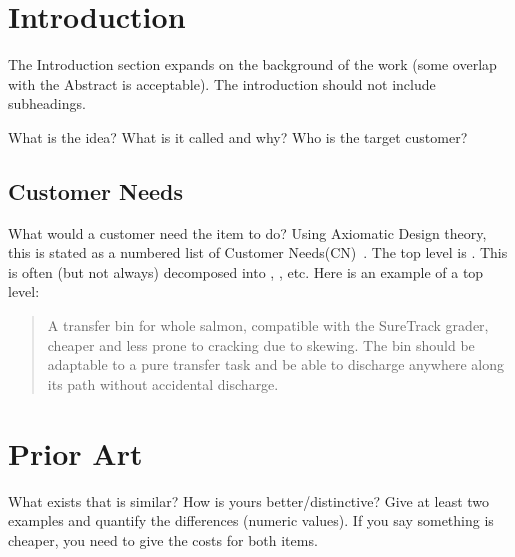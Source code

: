 \documentclass[sn-mathphys,pdflatex]{sn-jnl}%
\theoremstyle{thmstyleone}%
\theoremstyle{thmstyletwo}%
\theoremstyle{thmstylethree}%
\begin{document}
\section{Introduction}\label{sec:introduction}
The Introduction section expands on the background of the work (some overlap with the Abstract is acceptable).
The introduction should not include subheadings.

What is the idea?  What is it called and why?
Who is the target customer?



\subsection{Customer Needs}\label{sec:customer-needs}
What would a customer need the item to do?  
Using Axiomatic Design theory, this is stated as a numbered list of Customer Needs(CN)~\cite{suh1990principles}.
The top level is .
This is often (but not always) decomposed into , , etc.
Here is an example of a top level:

\begin{quote} \textbf{} A transfer bin for whole salmon, compatible with the SureTrack grader, cheaper and less prone to cracking due to skewing.  
The bin should be adaptable to a pure transfer task and be able to discharge anywhere along its path without
accidental discharge.~\cite{gerhard2016suretrack}
\end{quote}


\section{Prior Art}\label{sec:prior-art}
What exists that is similar?  How is yours better/distinctive?
Give at least two examples and quantify the differences (numeric values).
If you say something is cheaper, you need to give the costs for both items.
\end{document}
